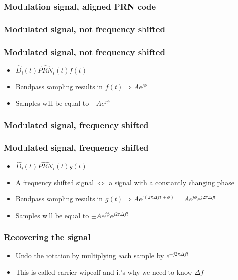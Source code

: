 \documentclass[aspectratio=169]{beamer}
\begin{document}
\subsubsection{Modulation signal, aligned PRN code}
\subsubsection{Modulated signal, not frequency shifted}

\begin{frame}
    \frametitle{Modulated signal, not frequency shifted}

    \begin{itemize}
        \item $\hat{D}_i(t) \hat{PRN}_i(t) f(t)$
        
        \item<2-> Bandpass sampling results in $f(t) \Rightarrow A e^{j \phi}$
        
        \item<3-> Samples will be equal to $\pm A e^{j \phi}$
    \end{itemize}
\end{frame}

\subsubsection{Modulated signal, frequency shifted}

\begin{frame}
    \frametitle{Modulated signal, frequency shifted}

    \begin{itemize}
        \item $\hat{D}_i(t) \hat{PRN}_i(t) g(t)$
        
        \item<2-> A frequency shifted signal $\Leftrightarrow$ a signal with a constantly changing phase
        
        \item<3-> Bandpass sampling results in $g(t) \Rightarrow A e^{j (2 \pi \Delta f t + \phi)} = A e^{j \phi} e^{j 2 \pi \Delta f t}$
        
        \item<4-> Samples will be equal to $\pm A e^{j \phi} e^{j 2 \pi \Delta f t}$
    \end{itemize}
\end{frame}

\begin{frame}
    \frametitle{Recovering the signal}

    \begin{itemize}
        \item<2-> Undo the rotation by multiplying each sample by $e^{-j 2 \pi \Delta f t}$
        
        \item<3-> This is called carrier wipeoff and it's why we need to know $\Delta f$
    \end{itemize}
\end{frame}
\end{document}
